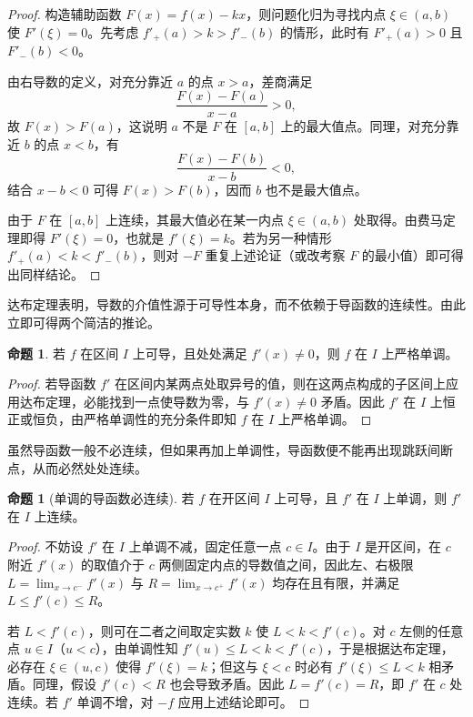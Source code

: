 \documentclass[UTF8,fontset=fandol,a4paper,12pt]{ctexart}
\theoremstyle{definition}
\newtheorem{proposition}[theorem]{命题}
\begin{document}
\begin{proof}
构造辅助函数 $F(x)=f(x)-kx$，则问题化归为寻找内点 $\xi\in(a,b)$ 使 $F'(\xi)=0$。先考虑 $f'_+(a)>k>f'_-(b)$ 的情形，此时有 $F'_+(a)>0$ 且 $F'_-(b)<0$。

由右导数的定义，对充分靠近 $a$ 的点 $x>a$，差商满足
\[
 \frac{F(x)-F(a)}{x-a}>0,
\]
故 $F(x)>F(a)$，这说明 $a$ 不是 $F$ 在 $[a,b]$ 上的最大值点。同理，对充分靠近 $b$ 的点 $x<b$，有
\[
 \frac{F(x)-F(b)}{x-b}<0,
\]
结合 $x-b<0$ 可得 $F(x)>F(b)$，因而 $b$ 也不是最大值点。

由于 $F$ 在 $[a,b]$ 上连续，其最大值必在某一内点 $\xi\in(a,b)$ 处取得。由费马定理即得 $F'(\xi)=0$，也就是 $f'(\xi)=k$。若为另一种情形 $f'_+(a)<k<f'_-(b)$，则对 $-F$ 重复上述论证（或改考察 $F$ 的最小值）即可得出同样结论。
\end{proof}

达布定理表明，导数的介值性源于可导性本身，而不依赖于导函数的连续性。由此立即可得两个简洁的推论。

\begin{proposition}
若 $f$ 在区间 $I$ 上可导，且处处满足 $f'(x)\ne0$，则 $f$ 在 $I$ 上严格单调。
\end{proposition}

\begin{proof}
若导函数 $f'$ 在区间内某两点处取异号的值，则在这两点构成的子区间上应用达布定理，必能找到一点使导数为零，与 $f'(x)\ne0$ 矛盾。因此 $f'$ 在 $I$ 上恒正或恒负，由严格单调性的充分条件即知 $f$ 在 $I$ 上严格单调。
\end{proof}

虽然导函数一般不必连续，但如果再加上单调性，导函数便不能再出现跳跃间断点，从而必然处处连续。

\begin{proposition}[单调的导函数必连续]
若 $f$ 在开区间 $I$ 上可导，且 $f'$ 在 $I$ 上单调，则 $f'$ 在 $I$ 上连续。
\end{proposition}

\begin{proof}
不妨设 $f'$ 在 $I$ 上单调不减，固定任意一点 $c\in I$。由于 $I$ 是开区间，在 $c$ 附近 $f'(x)$ 的取值介于 $c$ 两侧固定内点的导数值之间，因此左、右极限 $L=\lim_{x\to c^-}f'(x)$ 与 $R=\lim_{x\to c^+}f'(x)$ 均存在且有限，并满足 $L\le f'(c)\le R$。

若 $L<f'(c)$，则可在二者之间取定实数 $k$ 使 $L<k<f'(c)$。对 $c$ 左侧的任意点 $u\in I$（$u<c$），由单调性知 $f'(u)\le L<k<f'(c)$，于是根据达布定理，必存在 $\xi\in(u,c)$ 使得 $f'(\xi)=k$；但这与 $\xi<c$ 时必有 $f'(\xi)\le L<k$ 相矛盾。同理，假设 $f'(c)<R$ 也会导致矛盾。因此 $L=f'(c)=R$，即 $f'$ 在 $c$ 处连续。若 $f'$ 单调不增，对 $-f$ 应用上述结论即可。
\end{proof}
\end{document}
